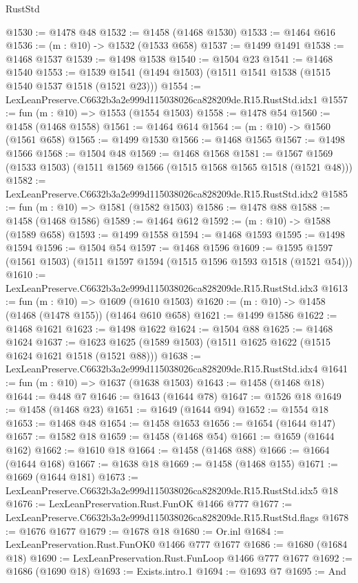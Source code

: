 \begin{lexlean}{RustStd}
\begin{coremodule}
@1530 := @1478 @48
@1532 := @1458 (@1468 @1530)
@1533 := @1464 @616
@1536 := (m : @10) -> @1532 (@1533 @658)
@1537 := @1499 @1491
@1538 := @1468 @1537
@1539 := @1498 @1538
@1540 := @1504 @23
@1541 := @1468 @1540
@1553 := @1539 @1541 (@1494 @1503) (@1511 @1541 @1538 (@1515 @1540 @1537 @1518 (@1521 @23)))
@1554 := LexLeanPreserve.C6632b3a2e999d115038026ca828209de.R15.RustStd.idx1
@1557 := fun (m : @10) => @1553 (@1554 @1503)
@1558 := @1478 @54
@1560 := @1458 (@1468 @1558)
@1561 := @1464 @614
@1564 := (m : @10) -> @1560 (@1561 @658)
@1565 := @1499 @1530
@1566 := @1468 @1565
@1567 := @1498 @1566
@1568 := @1504 @48
@1569 := @1468 @1568
@1581 := @1567 @1569 (@1533 @1503) (@1511 @1569 @1566 (@1515 @1568 @1565 @1518 (@1521 @48)))
@1582 := LexLeanPreserve.C6632b3a2e999d115038026ca828209de.R15.RustStd.idx2
@1585 := fun (m : @10) => @1581 (@1582 @1503)
@1586 := @1478 @88
@1588 := @1458 (@1468 @1586)
@1589 := @1464 @612
@1592 := (m : @10) -> @1588 (@1589 @658)
@1593 := @1499 @1558
@1594 := @1468 @1593
@1595 := @1498 @1594
@1596 := @1504 @54
@1597 := @1468 @1596
@1609 := @1595 @1597 (@1561 @1503) (@1511 @1597 @1594 (@1515 @1596 @1593 @1518 (@1521 @54)))
@1610 := LexLeanPreserve.C6632b3a2e999d115038026ca828209de.R15.RustStd.idx3
@1613 := fun (m : @10) => @1609 (@1610 @1503)
@1620 := (m : @10) -> @1458 (@1468 (@1478 @155)) (@1464 @610 @658)
@1621 := @1499 @1586
@1622 := @1468 @1621
@1623 := @1498 @1622
@1624 := @1504 @88
@1625 := @1468 @1624
@1637 := @1623 @1625 (@1589 @1503) (@1511 @1625 @1622 (@1515 @1624 @1621 @1518 (@1521 @88)))
@1638 := LexLeanPreserve.C6632b3a2e999d115038026ca828209de.R15.RustStd.idx4
@1641 := fun (m : @10) => @1637 (@1638 @1503)
@1643 := @1458 (@1468 @18)
@1644 := @448 @7
@1646 := @1643 (@1644 @78)
@1647 := @1526 @18
@1649 := @1458 (@1468 @23)
@1651 := @1649 (@1644 @94)
@1652 := @1554 @18
@1653 := @1468 @48
@1654 := @1458 @1653
@1656 := @1654 (@1644 @147)
@1657 := @1582 @18
@1659 := @1458 (@1468 @54)
@1661 := @1659 (@1644 @162)
@1662 := @1610 @18
@1664 := @1458 (@1468 @88)
@1666 := @1664 (@1644 @168)
@1667 := @1638 @18
@1669 := @1458 (@1468 @155)
@1671 := @1669 (@1644 @181)
@1673 := LexLeanPreserve.C6632b3a2e999d115038026ca828209de.R15.RustStd.idx5 @18
@1676 := LexLeanPreservation.Rust.FunOK @1466 @777
@1677 := LexLeanPreserve.C6632b3a2e999d115038026ca828209de.R15.RustStd.flags
@1678 := @1676 @1677
@1679 := @1678 @18
@1680 := Or.inl
@1684 := LexLeanPreservation.Rust.FunOK0 @1466 @777 @1677
@1686 := @1680 (@1684 @18)
@1690 := LexLeanPreservation.Rust.FunLoop @1466 @777 @1677
@1692 := @1686 (@1690 @18)
@1693 := Exists.intro.{1}
@1694 := @1693 @7
@1695 := And

\end{coremodule}
\end{lexlean}
